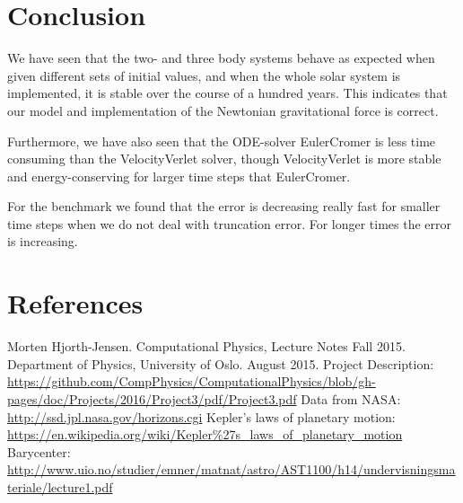 \documentclass[norsk,a4paper,12pt]{article}
\begin{document}
{\section{Conclusion}
We have seen that the two- and three body systems behave as expected when given different sets of initial values, and when the whole solar system is implemented, it is stable over the course of a hundred years. This indicates that our model and implementation of the Newtonian gravitational force is correct. \par 
Furthermore, we have also seen that the ODE-solver EulerCromer is less time consuming than the VelocityVerlet solver, though VelocityVerlet is more stable and energy-conserving for larger time steps that EulerCromer.

For the benchmark we found that the error is decreasing really fast for smaller time steps when we do not deal with truncation error. For longer times the error is increasing.
\newpage
\section{References}
\begingroup
\renewcommand{\section}[2]{}
\begin{thebibliography}{}
  Morten Hjorth-Jensen.
  Computational Physics, Lecture Notes Fall 2015.
  Department of Physics, University of Oslo.
  August 2015.
  Project Description:\newline
  \url{https://github.com/CompPhysics/ComputationalPhysics/blob/gh-pages/doc/Projects/2016/Project3/pdf/Project3.pdf}
  Data from NASA:\newline
  \url{http://ssd.jpl.nasa.gov/horizons.cgi}
  Kepler's laws of planetary motion:\newline
  \url{https://en.wikipedia.org/wiki/Kepler\%27s_laws_of_planetary_motion}
  Barycenter:\newline
  \url{http://www.uio.no/studier/emner/matnat/astro/AST1100/h14/undervisningsmateriale/lecture1.pdf}
\end{thebibliography}
\endgroup
\end{document}
